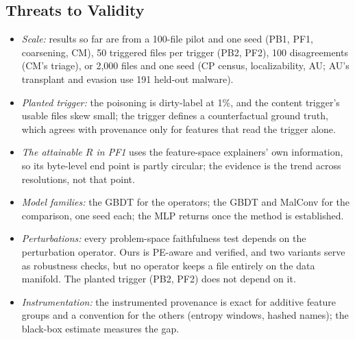 \subsection{Threats to Validity}

\begin{itemize}[noitemsep, topsep=2pt]
    \item \textit{Scale:} results so far are from a 100-file pilot and one seed (PB1, PF1, coarsening, CM), 50 triggered files per trigger (PB2, PF2), 100 disagreements (CM's triage), or 2{,}000 files and one seed (CP census, localizability, AU; AU's transplant and evasion use 191 held-out malware).
    \item \textit{Planted trigger:} the poisoning is dirty-label at 1\%, and the content trigger's usable files skew small; the trigger defines a counterfactual ground truth, which agrees with provenance only for features that read the trigger alone.
    \item \textit{The attainable $R$ in PF1} uses the feature-space explainers' own information, so its byte-level end point is partly circular; the evidence is the trend across resolutions, not that point.
    \item \textit{Model families:} the GBDT for the operators; the GBDT and MalConv for the comparison, one seed each; the MLP returns once the method is established.
    \item \textit{Perturbations:} every problem-space faithfulness test depends on the perturbation operator. Ours is PE-aware and verified, and two variants serve as robustness checks, but no operator keeps a file entirely on the data manifold. The planted trigger (PB2, PF2) does not depend on it.
    \item \textit{Instrumentation:} the instrumented provenance is exact for additive feature groups and a convention for the others (entropy windows, hashed names); the black-box estimate measures the gap.
\end{itemize}

